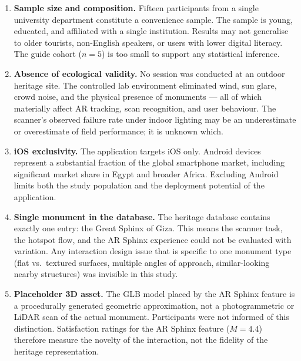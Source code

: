 \begin{enumerate}
  \item \textbf{Sample size and composition.} Fifteen participants from a single
        university department constitute a convenience sample. The sample is young,
        educated, and affiliated with a single institution. Results may not generalise
        to older tourists, non-English speakers, or users with lower digital literacy.
        The guide cohort ($n=5$) is too small to support any statistical inference.

  \item \textbf{Absence of ecological validity.} No session was conducted at an outdoor
        heritage site. The controlled lab environment eliminated wind, sun glare, crowd
        noise, and the physical presence of monuments — all of which materially affect
        AR tracking, scan recognition, and user behaviour. The scanner's observed
        failure rate under indoor lighting may be an underestimate or overestimate of
        field performance; it is unknown which.

  \item \textbf{iOS exclusivity.} The application targets iOS only. Android devices
        represent a substantial fraction of the global smartphone market, including
        significant market share in Egypt and broader Africa. Excluding Android limits
        both the study population and the deployment potential of the application.

  \item \textbf{Single monument in the database.} The heritage database contains exactly
        one entry: the Great Sphinx of Giza. This means the scanner task, the hotspot
        flow, and the AR Sphinx experience could not be evaluated with variation. Any
        interaction design issue that is specific to one monument type (flat vs.\
        textured surfaces, multiple angles of approach, similar-looking nearby
        structures) was invisible in this study.

  \item \textbf{Placeholder 3D asset.} The GLB model placed by the AR Sphinx feature
        is a procedurally generated geometric approximation, not a photogrammetric or
        LiDAR scan of the actual monument. Participants were not informed of this
        distinction. Satisfaction ratings for the AR Sphinx feature ($M = 4.4$)
        therefore measure the novelty of the interaction, not the fidelity of the
        heritage representation.


\end{enumerate}

